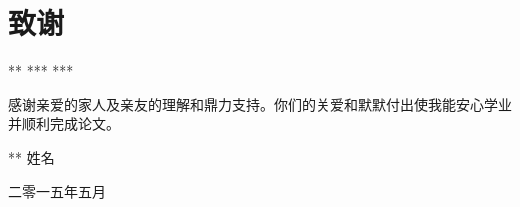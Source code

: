 
\section*{致\qquad 谢}
\ifpeerview *** *** *** \else 
{\kaishu
感谢亲爱的家人及亲友的理解和鼎力支持。你们的关爱和默默付出使我能安心学业并顺利完成论文。

\fi

\vspace{0.2cm} \hspace{10cm}  \ifpeerview *** \else 姓名\fi

\hspace{9.5cm} 二零一五年五月  }
